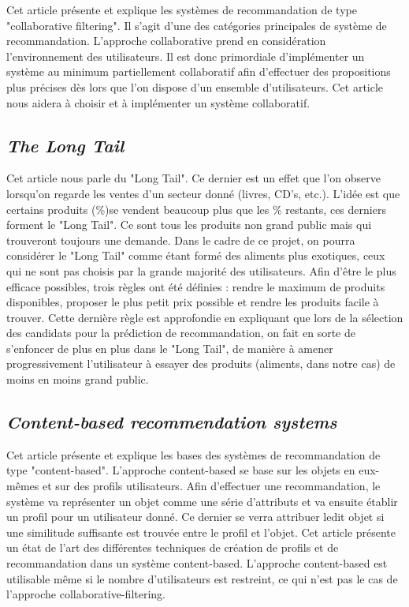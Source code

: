 \documentclass[a4paper, 11pt]{article}
\begin{document}
Cet article présente et explique les systèmes de recommandation de type "collaborative filtering". Il s'agit d'une des catégories principales de système de recommandation. L'approche collaborative prend en considération l'environnement des utilisateurs. Il est donc primordiale d'implémenter un système au minimum partiellement collaboratif afin d'effectuer des propositions plus précises dès lors que l'on dispose d'un ensemble d'utilisateurs. Cet article nous aidera à choisir et à implémenter un système collaboratif.



\subsection{\textit{The Long Tail} \cite{longtail}}

Cet article nous parle du "Long Tail". Ce dernier est un effet que l'on observe lorsqu'on regarde les ventes d'un secteur donné (livres, CD's, etc.). L'idée est que certains produits (\%)se vendent beaucoup plus que les \% restants, ces derniers forment le "Long Tail". Ce sont tous les produits non grand public mais qui trouveront toujours une demande. Dans le cadre de ce projet, on pourra considérer le "Long Tail" comme étant formé des aliments plus exotiques, ceux qui ne sont pas choisis par la grande majorité des utilisateurs. Afin d'être le plus efficace possibles, trois règles ont été définies : rendre le maximum de produits disponibles, proposer le plus petit prix possible et rendre les produits facile à trouver. Cette dernière règle est approfondie en expliquant que lors de la sélection des candidats pour la prédiction de recommandation, on fait en sorte de s'enfoncer de plus en plus dans le "Long Tail", de manière à amener progressivement l'utilisateur à essayer des produits (aliments, dans notre cas) de moins en moins grand public.

\subsection{\textit{Content-based recommendation systems} \cite{contentbased}}

Cet article présente et explique les bases des systèmes de recommandation de type "content-based". L'approche content-based se base sur les objets en eux-mêmes et sur des profils utilisateurs. Afin d'effectuer une recommandation, le système va représenter un objet comme une série d'attributs et va ensuite établir un profil pour un utilisateur donné. Ce dernier se verra attribuer ledit objet si une similitude suffisante est trouvée entre le profil et l'objet. Cet article présente un état de l'art des différentes techniques de création de profils et de recommandation dans un système content-based. L'approche content-based est utilisable même si le nombre d'utilisateurs est restreint, ce qui n'est pas le cas de l'approche collaborative-filtering.
\end{document}
